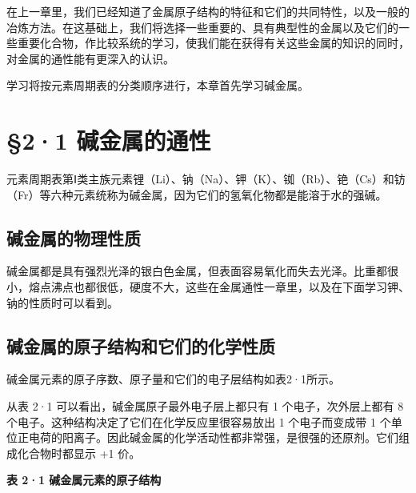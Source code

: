 在上一章里，我们已经知道了金属原子结构的特征和它们的共同特性，以及一般的冶炼方法。在这基础上，我们将选择一些重要的、具有典型性的金属以及它们的一些重要化合物，作比较系统的学习，使我们能在获得有关这些金属的知识的同时，对金属的通性能有更深入的认识。

学习将按元素周期表的分类顺序进行，本章首先学习碱金属。

\section{§2·1 碱金属的通性}

元素周期表第Ⅰ类主族元素锂（Li）、钠（Na）、钾（K）、铷（Rb）、铯（Cs）和钫（Fr）等六种元素统称为碱金属，因为它们的氢氧化物都是能溶于水的强碱。

\subsection{碱金属的物理性质}

碱金属都是具有强烈光泽的银白色金属，但表面容易氧化而失去光泽。比重都很小，熔点沸点也都很低，硬度不大，这些在金属通性一章里，以及在下面学习钾、钠的性质时可以看到。

\subsection{碱金属的原子结构和它们的化学性质}

碱金属元素的原子序数、原子量和它们的电子层结构如表2·1所示。

从表 2·1 可以看出，碱金属原子最外电子层上都只有 1 个电子，次外层上都有 8
个电子。这种结构决定了它们在化学反应里很容易放出 1 个电子而变成带 1
个单位正电荷的阳离子。因此碱金属的化学活动性都非常强，是很强的还原剂。它们组成化合物时都显示
+1 价。

\textbf{表 2·1 碱金属元素的原子结构}

